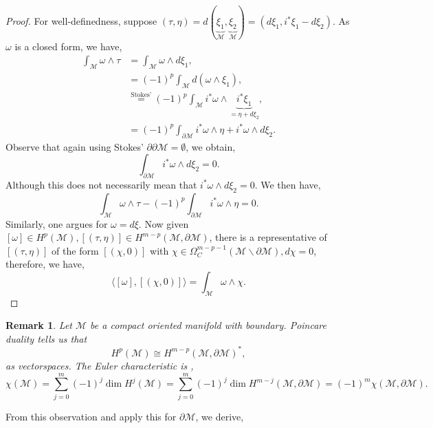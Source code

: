 \documentclass[10pt]{article}
\newtheorem{remark}{Remark}[section]
\newcommand{\M}[0]{\mathcal{M}}
\begin{document}
\begin{proof}
  For well-definedness, suppose $(\tau,\eta)=d(\underbrace{\xi_1}_{\M},\underbrace{\xi_2}_{\M})=(d\xi_1,i^*\xi_1-d\xi_2)$.
  As $\omega$ is a closed form, we have,
  \begin{align*}
    \int_{\M}\omega\wedge\tau & = \int_\M\omega\wedge d\xi_1,\\
    &=(-1)^p\int_\M d(\omega\wedge\xi_1),\\
    &\stackrel{\text{Stokes'}}{=}(-1)^p\int_\M i^*\omega\wedge\underbrace{i^*\xi_1}_{=\eta+d\xi_2},\\
    & = (-1)^p\int_{\partial\M}i^*\omega\wedge\eta+i^*\omega\wedge d\xi_2.
  \end{align*}
  Observe that again using Stokes' $\partial\partial\M=\emptyset$, we obtain,
  \begin{equation*}
    \int_{\partial\M}i^*\omega\wedge d\xi_2=0.
  \end{equation*}
  Although this does not necessarily mean that $i^*\omega\wedge d\xi_2=0$. We then have,
  \begin{equation*}
    \int_\M\omega\wedge\tau - (-1)^p\int_{\partial\M}i^*\omega\wedge\eta=0.
  \end{equation*}
  Similarly, one argues for $\omega=d\xi$. Now given $[\omega]\in H^p(\M),[(\tau,\eta)]\in H^{m-p}(\M,\partial\M)$, there is a representative of $[(\tau,\eta)]$ of the form $[(\chi,0)]$ with $\chi\in\Omega_C^{m-p-1}(\M\backslash\partial\M), d\chi=0$,
  therefore, we have,
  \begin{equation*}
    \langle[\omega],[(\chi,0)]\rangle = \int_\M\omega\wedge\chi.
  \end{equation*}
\end{proof}
\begin{remark}
  Let $\M$ be a compact oriented manifold with boundary. Poincare duality tells us that 
  \begin{equation*}
    H^p(\M)\cong H^{m-p}(\M,\partial\M)^*,
  \end{equation*}
  as vectorspaces. The Euler characteristic is ,
  \begin{equation*}
    \chi(\M)=\sum_{j=0}^m(-1)^j\dim H^j(\M)=\sum_{j=0}^m(-1)^j\dim H^{m-j}(\M,\partial\M)=(-1)^m\chi(\M,\partial\M).
  \end{equation*}
\end{remark}
From this observation and apply this for $\partial\M$, we derive,
\end{document}
